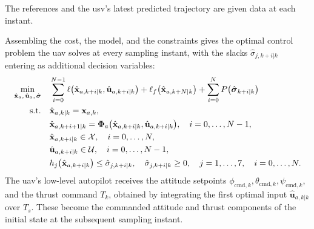The references and the \gls{usv}'s latest predicted trajectory are given data at each instant.

Assembling the cost, the model, and the constraints gives the optimal control problem the \gls{uav} solves at every sampling instant, with the slacks $\hat\sigma_{j,k+i|k}$ entering as additional decision variables:
\begin{align}
    \min_{\hat{\mathbf{x}}_a,\,\hat{\mathbf{u}}_a,\,\hat{\boldsymbol\sigma}} \quad & \sum_{i=0}^{N-1} \ell\big(\hat{\mathbf{x}}_{a,k+i|k},\hat{\mathbf{u}}_{a,k+i|k}\big) + \ell_f\big(\hat{\mathbf{x}}_{a,k+N|k}\big) + \sum_{i=0}^{N} P\big(\hat{\boldsymbol\sigma}_{k+i|k}\big) \notag \\
    \text{s.t.} \quad & \hat{\mathbf{x}}_{a,k|k} = \mathbf{x}_{a,k}, \notag \\
    & \hat{\mathbf{x}}_{a,k+i+1|k} = \boldsymbol\Phi_a\big(\hat{\mathbf{x}}_{a,k+i|k},\hat{\mathbf{u}}_{a,k+i|k}\big), \quad i=0,\dots,N-1, \notag \\
    & \hat{\mathbf{x}}_{a,k+i|k} \in \mathcal{X}, \quad i=0,\dots,N, \notag \\
    & \hat{\mathbf{u}}_{a,k+i|k} \in \mathcal{U}, \quad i=0,\dots,N-1, \notag \\
    & h_j\big(\hat{\mathbf{x}}_{a,k+i|k}\big) \le \hat\sigma_{j,k+i|k}, \quad \hat\sigma_{j,k+i|k} \ge 0, \quad j=1,\dots,7, \quad i=0,\dots,N. \label{eq:uav_mpc_ocp}
\end{align}
The \gls{uav}'s low-level autopilot receives the attitude setpoints $\phi_{\mathrm{cmd},k}, \theta_{\mathrm{cmd},k}, \psi_{\mathrm{cmd},k}$, and the thrust command $T_k$, obtained by integrating the first optimal input $\hat{\mathbf{u}}_{a,k|k}$ over $T_s$. These become the commanded attitude and thrust components of the initial state at the subsequent sampling instant.
